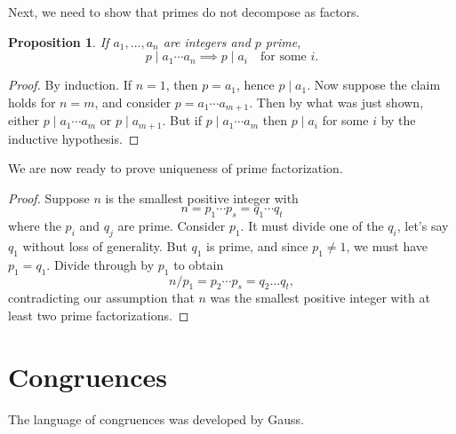 \documentclass{amsbook}
\numberwithin{section}{chapter}
\theoremstyle{plain}
\newtheorem{prop}[thm]{Proposition}
\theoremstyle{definition}
\begin{document}
\pagebreak

Next, we need to show that primes do not decompose as factors.
\begin{prop}
If $a_1,\dots, a_n$ are integers and $p$ prime, 
\[p\mid a_1\cdots a_n\implies p\mid a_i\quad\text{for some }i.\]
\end{prop}
\begin{proof}
By induction. If $n = 1$, then $p = a_1$, hence $p\mid a_1$.
Now suppose the claim holds for $n = m$, and consider
$p = a_1\cdots a_{m+1}$. Then by what was just shown, either
$p\mid a_1\cdots a_m$ or $p\mid a_{m+1}$. But if $p\mid a_1\cdots a_m$
then $p\mid a_i$ for some $i$ by the inductive hypothesis.
\end{proof}
We are now ready to prove uniqueness of prime factorization.
\begin{proof}
Suppose $n$ is the smallest positive integer with
\[n = p_1\cdots p_s = q_1\cdots q_t\]
where the $p_i$ and $q_j$ are prime. Consider $p_1$. It must divide
one of the $q_i$, let's say $q_1$ without loss of generality.
But $q_1$
is prime, and since $p_1\ne 1$, we must have $p_1 = q_1$.
Divide through
by $p_1$ to obtain
\[n/p_1 = p_2\cdots p_s = q_2\dots q_t,\]
contradicting our assumption that $n$ was the smallest positive
integer with at least two prime factorizations.
\end{proof}
\chapter{Congruences}
The language of congruences was developed by Gauss.
\end{document}

